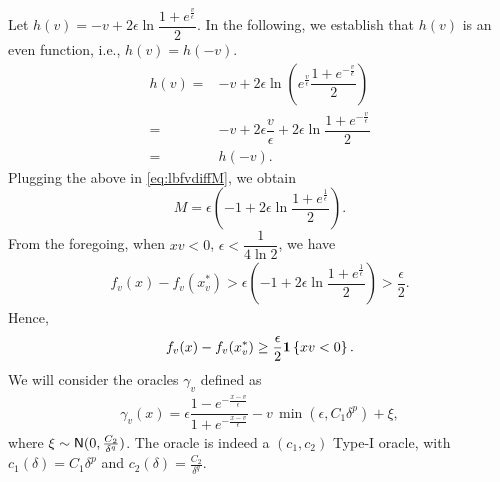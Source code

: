 Let $h(v) = -v + 2\epsilon\ln\dfrac{1+e^{\frac{v}{\epsilon}}}{2}$. In the following, we establish that  $h(v)$ is an even function, i.e., $h(v) = h(-v)$.
\begin{align*}
h(v) =& -v + 2\epsilon\ln\left(e^{\frac{v}{\epsilon}} \dfrac{1+e^{-\frac{v}{\epsilon}}}{2}\right)\\
=& -v + 2\epsilon \dfrac{v}{\epsilon}  + 2\epsilon\ln\dfrac{1+e^{-\frac{v}{\epsilon}}}{2}\\
= & h(-v).
\end{align*}
Plugging the above in \eqref{eq:lbfvdiffM}, we obtain
$$ M = \epsilon\left(-1 + 2\epsilon\ln\dfrac{1+e^{\frac{1}{\epsilon}}}{2}\right).$$
From the foregoing, when $xv<0$, $\epsilon<\dfrac{1}{4\ln 2}$,  we have
\begin{align*}
f_v(x)-f_v(x_v^*) >\epsilon\left( -1 +2\epsilon \ln\dfrac{1+e^{\frac{1}{\epsilon}}}{2}  \right)> \dfrac{\epsilon}{2}.
\end{align*}
Hence,
\begin{align}
  f_v(x) - f_v(x^*_v)
  \ge \dfrac{\epsilon}{2}  \mathbf{1}\left\{x v  < 0\right\}. \label{eq:fv-lb}
\end{align}
We will consider the oracles $\gamma_v$ defined as 
\begin{align}
 \gamma_v(x) = \epsilon \dfrac{1-e^{-\frac{x-v}{\epsilon}}}{1+e^{-\frac{x-v}{\epsilon}}} - v\, \min(\epsilon,C_1 \delta^p) + \xi, \label{eq:main:oracle-1d}
\end{align}
where $\xi \sim \mathsf{N}(0,\frac{C_2}{\delta^q})$.
The oracle is indeed a $(c_1,c_2)$ Type-I oracle, with $c_1(\delta)=C_1\delta^p$ and $c_2(\delta)=\frac{C_2}{\delta^q}$.

